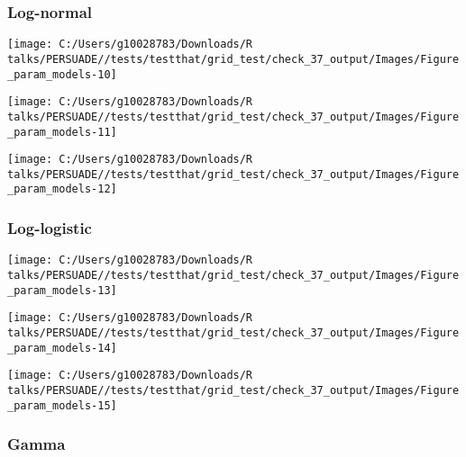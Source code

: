 \documentclass[
]{article}
\begin{document}
\clearpage

\subsubsection{Log-normal}\label{log-normal}

\begin{flushleft}\texttt{[image: C:/Users/g10028783/Downloads/R talks/PERSUADE//tests/testthat/grid\_test/check\_37\_output/Images/Figure\_param\_models-10]} \end{flushleft}

\begin{flushleft}\texttt{[image: C:/Users/g10028783/Downloads/R talks/PERSUADE//tests/testthat/grid\_test/check\_37\_output/Images/Figure\_param\_models-11]} \end{flushleft}

\begin{flushleft}\texttt{[image: C:/Users/g10028783/Downloads/R talks/PERSUADE//tests/testthat/grid\_test/check\_37\_output/Images/Figure\_param\_models-12]} \end{flushleft}

\clearpage

\subsubsection{Log-logistic}\label{log-logistic}

\begin{flushleft}\texttt{[image: C:/Users/g10028783/Downloads/R talks/PERSUADE//tests/testthat/grid\_test/check\_37\_output/Images/Figure\_param\_models-13]} \end{flushleft}

\begin{flushleft}\texttt{[image: C:/Users/g10028783/Downloads/R talks/PERSUADE//tests/testthat/grid\_test/check\_37\_output/Images/Figure\_param\_models-14]} \end{flushleft}

\begin{flushleft}\texttt{[image: C:/Users/g10028783/Downloads/R talks/PERSUADE//tests/testthat/grid\_test/check\_37\_output/Images/Figure\_param\_models-15]} \end{flushleft}

\clearpage

\subsubsection{Gamma}\label{gamma}
\end{document}
